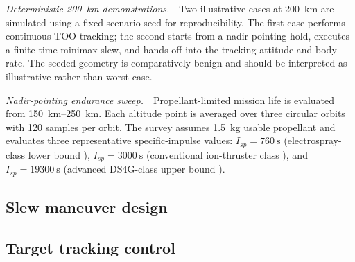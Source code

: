 \documentclass[conf]{new-aiaa}
\begin{document}
\textit{Deterministic \SI{200}{\kilo\meter} demonstrations.}\ \ Two illustrative cases at \SI{200}{\kilo\meter} are simulated using a fixed scenario seed for reproducibility. The first case performs continuous TOO tracking; the second starts from a nadir-pointing hold, executes a finite-time minimax slew, and hands off into the tracking attitude and body rate. The seeded geometry is comparatively benign and should be interpreted as illustrative rather than worst-case.

\textit{Nadir-pointing endurance sweep.}\ \ Propellant-limited mission life is evaluated from \SIrange{150}{250}{\kilo\meter}. Each altitude point is averaged over three circular orbits with 120 samples per orbit. The survey assumes \SI{1.5}{\kilogram} usable propellant and evaluates three representative specific-impulse values: $I_{sp}=\SI{760}{\second}$ (electrospray-class lower bound \cite{krejci2017}), $I_{sp}=\SI{3000}{\second}$ (conventional ion-thruster class \cite{nasalowpower}), and $I_{sp}=\SI{19300}{\second}$ (advanced DS4G-class upper bound \cite{ds4goverview}).

\subsection{Slew maneuver design} \label{subsec:slewing}


\subsection{Target tracking control} \label{subsec:tracking}


\end{document}

